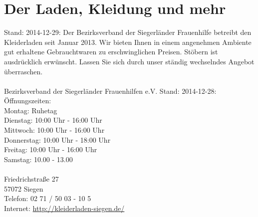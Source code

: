 \section{Der Laden, Kleidung und mehr}
Stand: 2014-12-29: Der Bezirksverband der Siegerländer Frauenhilfe betreibt den Kleiderladen seit Januar 2013. Wir bieten Ihnen in einem angenehmen Ambiente gut erhaltene Gebrauchtwaren zu erschwinglichen Preisen. Stöbern ist ausdrücklich erwünscht. Lassen Sie sich durch unser ständig wechselndes Angebot überraschen.\\
\\
Bezirksverband der Siegerländer Frauenhilfen e.V. 
Stand: 2014-12-28: Öffnungszeiten: \\
Montag: Ruhetag\\
Dienstag: 10:00 Uhr - 16:00 Uhr\\
Mittwoch: 10:00 Uhr - 16:00 Uhr\\
Donnerstag: 10:00 Uhr - 18:00 Uhr\\
Freitag: 10:00 Uhr - 16:00 Uhr\\
Samstag: 10.00 - 13.00\\
\\
Friedrichstraße 27\\
57072 Siegen\\
Telefon: 02 71 / 50 03 - 10 5\\
Internet: \href{http://kleiderladen-siegen.de/}{http://kleiderladen-siegen.de/}